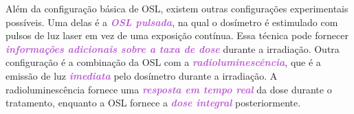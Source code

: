 \documentclass[11pt,a4paper]{article}
\begin{document}
	Além da configuração básica de OSL, existem outras configurações experimentais possíveis. Uma delas é a \textcolor{MediumOrchid}{\textit{\textbf{OSL pulsada}}}, na qual o dosímetro é estimulado com pulsos de luz laser em vez de uma exposição contínua. Essa técnica pode fornecer \textcolor{MediumOrchid}{\textit{\textbf{informações adicionais sobre a taxa de dose}}} durante a irradiação. Outra configuração é a combinação da OSL com a \textcolor{MediumOrchid}{\textit{\textbf{radioluminescência}}}, que é a emissão de luz \textcolor{MediumOrchid}{\textit{\textbf{imediata}}} pelo dosímetro durante a irradiação. A radioluminescência fornece uma \textcolor{MediumOrchid}{\textit{\textbf{resposta em tempo real}}} da dose durante o tratamento, enquanto a OSL fornece a \textcolor{MediumOrchid}{\textit{\textbf{dose integral}}} posteriormente.



\end{document}
